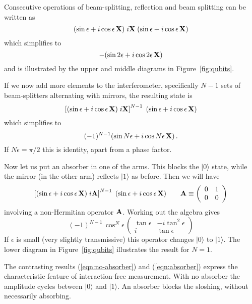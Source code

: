 \documentclass[12pt,aps,prb,preprint]{revtex4}
\def\ket#1{|#1\rangle}
\def\X{{\bf X}}
\def\A{{\bf A}}
\begin{document}
Consecutive operations of beam-splitting, reflection and beam
splitting can be written as
\begin{equation}
     (\sin\epsilon + i\cos\epsilon\,\X)
     \; i\X \;
     (\sin\epsilon + i\cos\epsilon\,\X)
\end{equation}
which simplifies to
\begin{equation}
     -(\sin2\epsilon + i\cos2\epsilon\,\X)
\label{eqn:no-absorber}
\end{equation}
and is illustrated by the upper and middle diagrams in
Figure~\ref{fig:qubits}.

If we now add more elements to the interferometer, specifically $N-1$
sets of beam-splitters alternating with mirrors, the resulting state
is
\begin{equation}
     \left[ (\sin\epsilon + i\cos\epsilon\,\X) \; i\X \right]^{N-1} \;
     (\sin\epsilon + i\cos\epsilon\,\X)
\end{equation}
which simplifies to
\begin{equation}
     (-1)^{N-1} (\sin N\epsilon + i\cos N\epsilon\,\X)  \,.
\end{equation}
If $N\epsilon=\pi/2$ this is identity, apart from a phase factor.

Now let us put an absorber in one of the arms.  This blocks the
$\ket0$ state, while the mirror (in the other arm) reflects $\ket1$ as
before.  Then we will have
\begin{equation}
     \left[ (\sin\epsilon + i\cos\epsilon\,\X) \; i\A \right]^{N-1} \;
     (\sin\epsilon + i\cos\epsilon\,\X)
  \qquad
   \A \equiv \left( \begin{array}{cc} 0 & 1 \\ 0 & 0 \end{array} \right)
\end{equation}
involving a non-Hermitian operator $\A$.  Working out the algebra
gives
\begin{equation}
(-1)^{N-1} \, \cos^N\!\epsilon \,
\left( \begin{array}{cc} \tan\epsilon & -i\tan^2\epsilon \\
                         i            & \tan\epsilon 
       \end{array} \right)
\label{eqn:absorber}
\end{equation}
If $\epsilon$ is small (very slightly transmissive) this operator
changes $\ket0$ to $\ket1$.  The lower diagram in
Figure~\ref{fig:qubits} illustrates the result for $N=1$.

The contrasting results (\ref{eqn:no-absorber}) and
(\ref{eqn:absorber}) express the characteristic feature of
interaction-free measurement.  With no absorber the amplitude cycles
between $\ket0$ and $\ket1$.  An absorber blocks the sloshing, without
necessarily absorbing.
\end{document}
